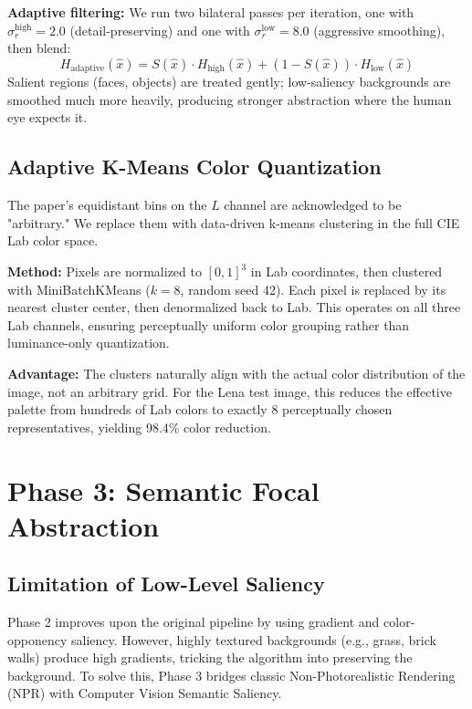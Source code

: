 \documentclass[conference]{IEEEtran}
\begin{document}
\textbf{Adaptive filtering:} We run two bilateral passes per iteration, one with $\sigma_r^\text{high} = 2.0$ (detail-preserving) and one with $\sigma_r^\text{low} = 8.0$ (aggressive smoothing), then blend:
\begin{equation}
H_\text{adaptive}(\hat{x}) = S(\hat{x})\cdot H_\text{high}(\hat{x}) + (1 - S(\hat{x}))\cdot H_\text{low}(\hat{x})
\end{equation}
Salient regions (faces, objects) are treated gently; low-saliency backgrounds are smoothed much more heavily, producing stronger abstraction where the human eye expects it.

\subsection{Adaptive K-Means Color Quantization}

The paper's equidistant bins on the $L$ channel are acknowledged to be "arbitrary." We replace them with data-driven k-means clustering in the full CIE Lab color space.

\textbf{Method:} Pixels are normalized to $[0,1]^3$ in Lab coordinates, then clustered with MiniBatchKMeans ($k = 8$, random seed 42). Each pixel is replaced by its nearest cluster center, then denormalized back to Lab. This operates on all three Lab channels, ensuring perceptually uniform color grouping rather than luminance-only quantization.

\textbf{Advantage:} The clusters naturally align with the actual color distribution of the image, not an arbitrary grid. For the Lena test image, this reduces the effective palette from hundreds of Lab colors to exactly 8 perceptually chosen representatives, yielding 98.4\% color reduction.

\section{Phase 3: Semantic Focal Abstraction}

\subsection{Limitation of Low-Level Saliency}
Phase 2 improves upon the original pipeline by using gradient and color-opponency saliency. However, highly textured backgrounds (e.g., grass, brick walls) produce high gradients, tricking the algorithm into preserving the background. To solve this, Phase 3 bridges classic Non-Photorealistic Rendering (NPR) with Computer Vision Semantic Saliency.
\end{document}
